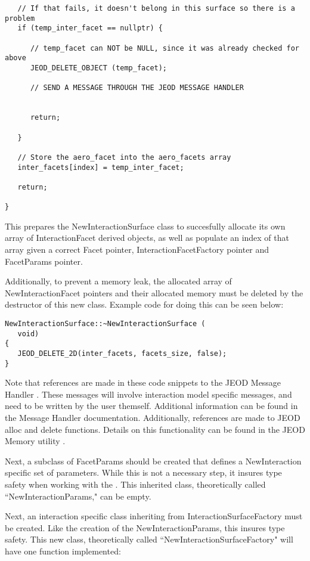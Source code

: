 \begin{verbatim}
   // If that fails, it doesn't belong in this surface so there is a problem
   if (temp_inter_facet == nullptr) {

      // temp_facet can NOT be NULL, since it was already checked for above
      JEOD_DELETE_OBJECT (temp_facet);

      // SEND A MESSAGE THROUGH THE JEOD MESSAGE HANDLER


      return;

   }

   // Store the aero_facet into the aero_facets array
   inter_facets[index] = temp_inter_facet;

   return;

}
\end{verbatim}

This prepares the NewInteractionSurface class to succesfully allocate its
own array of InteractionFacet derived objects, as well as populate an
index of that array given a correct Facet pointer, InteractionFacetFactory
pointer and FacetParams pointer.

Additionally, to prevent a memory leak, the allocated array of
NewInteractionFacet pointers and their allocated memory must be
deleted by the destructor of this new class. Example code for doing this
can be seen below:

\begin{verbatim}
NewInteractionSurface::~NewInteractionSurface (
   void)
{
   JEOD_DELETE_2D(inter_facets, facets_size, false);
}
\end{verbatim}

Note that references are made in these code snippets
to the JEOD Message Handler
\cite{dynenv:MESSAGE}. These messages will involve interaction model
specific messages, and need to be written by the user themself. Additional
information can be found in the Message Handler documentation. Additionally,
references are made to JEOD alloc and delete functions. Details on this
functionality can be found in the JEOD Memory utility
\cite{dynenv:MEMORY}.

Next, a subclass of FacetParams should be created that defines a
NewInteraction specific set of parameters. While this is not a necessary
step, it insures type safety when working with the \ModelDesc.
This inherited class, theoretically called ``NewInteractionParams," can be
empty.

Next, an interaction specific class inheriting from
InteractionSurfaceFactory must be created. Like the creation of the
NewInteractionParams, this insures type safety. This new class,
theoretically called ``NewInteractionSurfaceFactory" will have one
function implemented:

